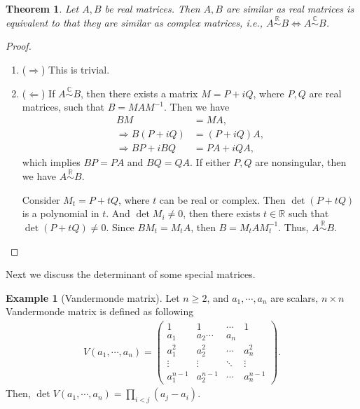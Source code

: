 \documentclass[11pt]{book}
\newtheorem{theorem}{Theorem}[chapter]
\theoremstyle{definition}
\newtheorem{example}{Example}[chapter]
\numberwithin{equation}{chapter}
\begin{document}
\medskip

\begin{theorem}
Let $A,B$ be real matrices. Then $A,B$ are similar as real matrices is equivalent to that they are similar as complex matrices, i.e., $A \overset{\mathbb{R}}{\sim} B\iff A \overset{\mathbb{C}}{\sim} B$.
\end{theorem}
\begin{proof}
~\begin{enumerate}[label=(\arabic*)]
    \item ($\Rightarrow$) This is trivial.
    \item ($\Leftarrow$) If $A \overset{\mathbb{C}}{\sim} B$, then there exists a matrix $M = P + iQ$, where $P,Q$ are real matrices, such that $B = MAM^{-1}$. Then we have
    \begin{align*}
        BM & = MA, \\
        \Rightarrow B(P + iQ) & = (P + iQ)A, \\
        \Rightarrow BP + i BQ & = PA + i QA,
    \end{align*}
    which implies $BP=PA$ and $BQ = QA$. If either $P,Q$ are nonsingular, then we have $A \overset{\mathbb{R}}{\sim} B$.
    
    Consider $M_t = P + tQ$, where $t$ can be real or complex. Then $\det (P+tQ)$ is a polynomial in $t$. And $\det M_i \neq 0$, then there exists $t\in\mathbb{R}$ such that $\det (P+tQ)\neq 0$. Since $BM_t = M_t A$, then $B = M_t A M_t^{-1}$. Thus, $A \overset{\mathbb{R}}{\sim} B$.
\end{enumerate}
\end{proof}

\medskip

Next we discuss the determinant of some special matrices.

\begin{example}[Vandermonde matrix]
Let $n\geq 2$, and $a_1, \cdots, a_n$ are scalars, $n\times n$ Vandermonde matrix is defined as following
\begin{align*}
    V(a_1,\cdots,a_n) = \left(\begin{matrix}
        1 & 1 & \cdots & 1\\
        a_1 & a_2 \cdots & a_n \\
        a_1^2 & a_2^2 & \cdots & a_n^2 \\
        \vdots & \vdots & \ddots & \vdots \\
        a_1^{n-1} & a_2^{n-1} & \cdots & a_n^{n-1}
    \end{matrix}\right).
\end{align*}
Then, $\det V(a_1,\cdots,a_n) = \prod_{i < j}(a_j - a_i)$.
\end{example}
\end{document}
